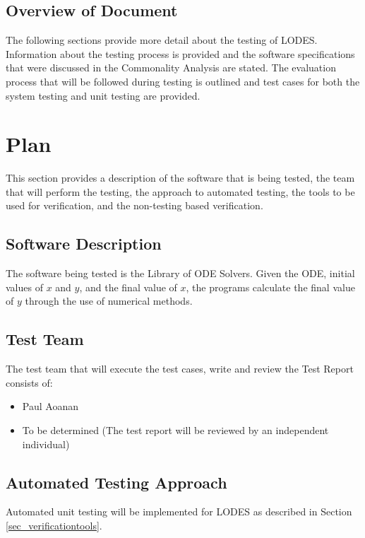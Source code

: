 \documentclass[12pt, titlepage]{article}
\newcommand{\famname}{LODES} %
\newcommand{\famdesc}{Library of ODE Solvers}
\begin{document}
\subsection{Overview of Document}
The following sections provide more detail about the testing of \famname{}.
Information about the testing process is provided and the software specifications
that were discussed in the Commonality Analysis are stated.
The evaluation process that will be followed during testing is outlined and test cases
for both the system testing and unit testing are provided.

\section{Plan}
This section provides a description of the software that is being tested, the team that will
perform the testing, the approach to automated testing, the tools to be used for verification,
and the non-testing based verification. 
	
\subsection{Software Description}
The software being tested is the \famdesc{}. Given the ODE, initial values of $x$ and $y$, and the final value of $x$,
the programs calculate the final value of $y$ through the use of numerical methods.

\subsection{Test Team}

The test team that will execute the test cases, write and review the Test Report consists of:
\begin{itemize}
 \item Paul Aoanan
 \item To be determined (The test report will be reviewed by an independent individual)
\end{itemize} 

\subsection{Automated Testing Approach}
Automated unit testing will be implemented for \famname{} as described in Section \ref{sec_verificationtools}.
\end{document}
